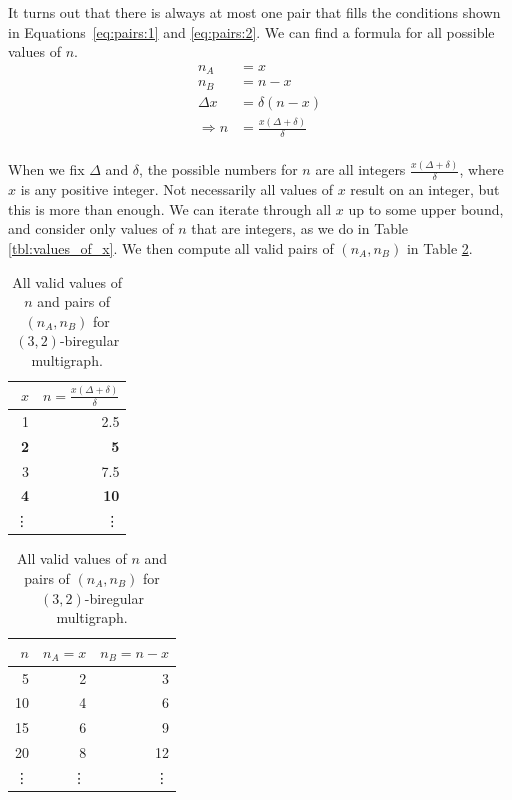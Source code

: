 It turns out that there is always at most one pair that fills the conditions shown in Equations~\ref{eq:pairs:1} and \ref{eq:pairs:2}.
We can find a formula for all possible values of $n$.
\begin{align*}
  n_A &= x \\
  n_B &= n-x\\
  \Delta x &= \delta (n-x) \\
  \Rightarrow n&=\frac{x(\Delta+\delta)}{\delta}\\
\end{align*}

When we fix $\Delta$ and $\delta$, the possible numbers for $n$ are all integers $\frac{x(\Delta + \delta)}{\delta}$, where $x$ is any positive integer.
Not necessarily all values of $x$ result on an integer, but this is more than enough.
We can iterate through all $x$ up to some upper bound, and consider only values of $n$ that are integers, as we do in Table \ref{tbl:values_of_x}.
We then compute all valid pairs of $(n_A, n_B)$ in Table \ref{tbl:valid_pairs}.

\begin{table}[H]
  \parbox{.45\linewidth}{
  \centering
  \begin{tabular}{rr}
    \toprule
    $x$&$n=\frac{x(\Delta + \delta)}{\delta}$\\
    \midrule
    1 & 2.5 \\
    \textbf{2} & \textbf{5}   \\
    3 & 7.5 \\
    \textbf{4} & \textbf{10}  \\
    \vdots & \vdots \\
    \bottomrule
  \end{tabular}
  \caption{
    All values of $x$ and $n$ for $(3,2)$-biregular multigraph.
    All rows, where $n$ is an integer, are bolded.
  }
  \label{tbl:values_of_x}
  }
  \hfill
  \parbox{.45\linewidth}{
  \centering
  \begin{tabular}{rrr}
    \toprule
    $n$&$n_A=x$&$n_B=n-x$\\
    \midrule
    5 & 2 & 3   \\
    10 & 4 & 6  \\
    15 & 6 & 9  \\
    20 & 8 & 12 \\
    \vdots & \vdots & \vdots\\
    \bottomrule
  \end{tabular}
  \caption{
    All valid values of $n$ and pairs of $(n_A, n_B)$ for $(3,2)$-biregular multigraph.
  }
  \label{tbl:valid_pairs}
  }
\end{table}

